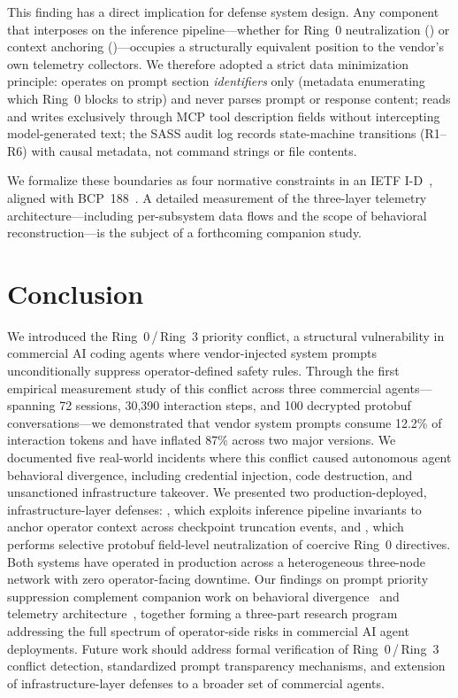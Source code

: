 This finding has a direct implication for defense system design.  Any component that interposes on the inference pipeline---whether for Ring~0 neutralization (\stls{}) or context anchoring (\reaper{})---occupies a structurally equivalent position to the vendor's own telemetry collectors.  We therefore adopted a strict data minimization principle: \stls{} operates on prompt section \emph{identifiers} only (metadata enumerating which Ring~0 blocks to strip) and never parses prompt or response content; \reaper{} reads and writes exclusively through MCP tool description fields without intercepting model-generated text; the SASS audit log records state-machine transitions (R1--R6) with causal metadata, not command strings or file contents.

We formalize these boundaries as four normative constraints in an IETF I-D~\cite{draft-sass}, aligned with BCP~188~\cite{rfc7258}.  A detailed measurement of the three-layer telemetry architecture---including per-subsystem data flows and the scope of behavioral reconstruction---is the subject of a forthcoming companion study.

\section{Conclusion}
\label{sec:conclusion}

We introduced the Ring~0\,/\,Ring~3 priority conflict, a structural vulnerability in commercial AI coding agents where vendor-injected system prompts unconditionally suppress operator-defined safety rules. Through the first empirical measurement study of this conflict across three commercial agents---spanning 72 sessions, 30{,}390 interaction steps, and 100 decrypted protobuf conversations---we demonstrated that vendor system prompts consume 12.2\% of interaction tokens and have inflated 87\% across two major versions. We documented five real-world incidents where this conflict caused autonomous agent behavioral divergence, including credential injection, code destruction, and unsanctioned infrastructure takeover. We presented two production-deployed, infrastructure-layer defenses: \reaper{}, which exploits inference pipeline invariants to anchor operator context across checkpoint truncation events, and \stls{}, which performs selective protobuf field-level neutralization of coercive Ring~0 directives. Both systems have operated in production across a heterogeneous three-node network with zero operator-facing downtime. Our findings on prompt priority suppression complement companion work on behavioral divergence~\cite{rogueagent2026} and telemetry architecture~\cite{aisec2026companion}, together forming a three-part research program addressing the full spectrum of operator-side risks in commercial AI agent deployments. Future work should address formal verification of Ring~0\,/\,Ring~3 conflict detection, standardized prompt transparency mechanisms, and extension of infrastructure-layer defenses to a broader set of commercial agents.

